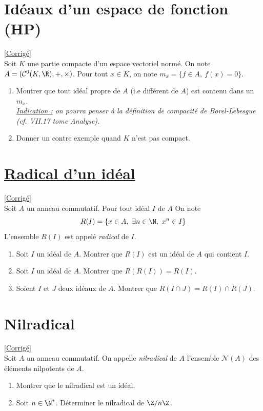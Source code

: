 \documentclass[8pt]{book}
\begin{document}
	\section{Idéaux d'un espace de fonction  (HP)}
	\label{Idéaux d'un espace de fonction}
	\textcolor{blue}{\hyperref[Idéaux d'un espace de fonction corrigé]{[Corrigé]}}\\
	Soit $K$ une partie compacte d'un espace vectoriel normé. On note $A=(\mathcal C^0(K,\R),+,\times)$. Pour tout $x\in K$, on note $m_x=\{f\in A,\ f(x)=0\}$.
	\begin{enumerate}
		\item Montrer que tout idéal propre de $A$ (i.e différent de $A$) est contenu dans un $m_x$.\\
		\textit{\underline{Indication :} on pourra penser à la définition de compacité de Borel-Lebesgue (cf. VII.17 tome Analyse).}
		\item Donner un contre exemple quand $K$ n'est pas compact.
	\end{enumerate}
	
	\section{\underline{Radical d'un idéal} }
	\label{Radical d'un idéal}
	\textcolor{blue}{\hyperref[Radical d'un idéal corrigé]{[Corrigé]}}\\
	Soit $A$ un anneau commutatif. Pour tout idéal $I$ de $A$ On note
	$$R(I)=\{x\in A,\ \exists n\in \N,\ x^n\in I\}$$
	L'ensemble $R(I)$ est appelé \textit{radical} de $I$.
	\begin{enumerate}
		\item Soit $I$ un idéal de $A$. Montrer que $R(I)$ est un idéal de $A$ qui contient $I$.
		\item Soit $I$ un idéal de $A$. Montrer que $R(R(I))=R(I)$.
		\item Soient $I$ et $J$ deux idéaux de $A$. Montrer que $R(I\cap J)=R(I)\cap R(J)$.
	\end{enumerate}
	
	\section{Nilradical }
	\label{Nilradical}
	\textcolor{blue}{\hyperref[Nilradical corrigé]{[Corrigé]}}\\
	Soit $A$ un anneau commutatif. On appelle \textit{nilradical} de $A$ l'ensemble $\mathcal N(A)$ des éléments nilpotents de $A$.
	\begin{enumerate}
		\item Montrer que le nilradical est un idéal.
		\item Soit $n\in \N^*$. Déterminer le nilradical de $\Z/n\Z$.
	\end{enumerate}
	
\end{document}
